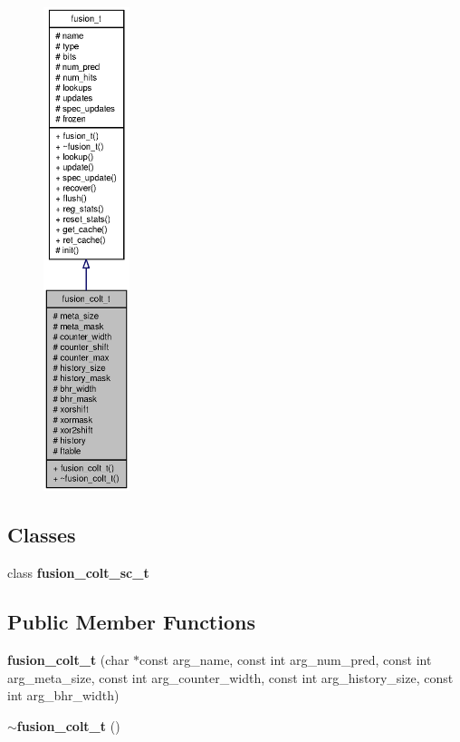 \begin{figure}[H]
\begin{center}
\leavevmode
\includegraphics[height=400pt]{classfusion__colt__t__coll__graph}
\end{center}
\end{figure}
\subsection*{Classes}
\begin{CompactItemize}
\item 
class {\bf fusion\_\-colt\_\-sc\_\-t}
\end{CompactItemize}
\subsection*{Public Member Functions}
\begin{CompactItemize}
\item 
{\bf fusion\_\-colt\_\-t} (char $\ast$const arg\_\-name, const int arg\_\-num\_\-pred, const int arg\_\-meta\_\-size, const int arg\_\-counter\_\-width, const int arg\_\-history\_\-size, const int arg\_\-bhr\_\-width)
\item 
{\bf $\sim$fusion\_\-colt\_\-t} ()
\end{CompactItemize}

